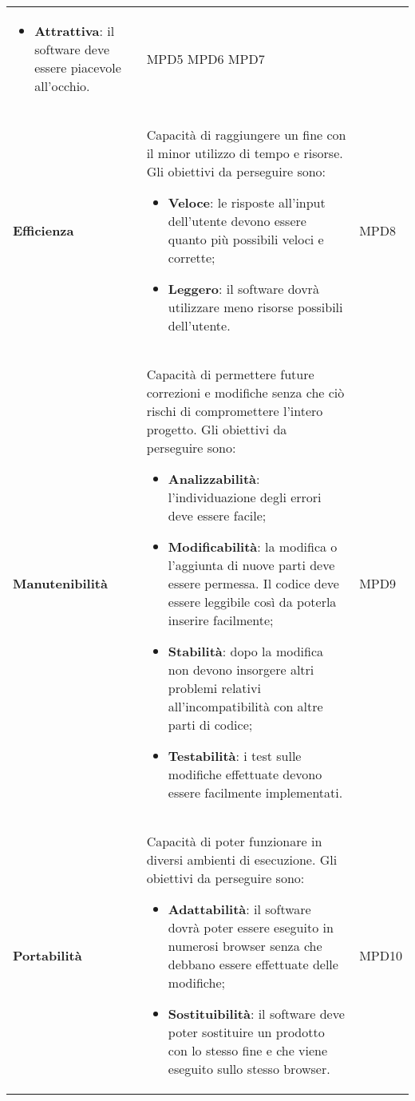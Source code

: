 \begin{longtable}{C{3cm} C{9.5cm} C{2.5cm}}
\begin{itemize}
		\item \textbf{Attrattiva}: il software deve essere piacevole all'occhio.
	\end{itemize} &
    MPD5 \newline MPD6 \newline MPD7 \\
	\textbf{Efficienza} & 
	Capacità di raggiungere un fine con il minor utilizzo di tempo e risorse. Gli obiettivi da perseguire sono: 
		\begin{itemize}
		\item \textbf{Veloce}: le risposte all'input dell'utente devono essere quanto più possibili veloci e corrette;
		\item \textbf{Leggero}: il software dovrà utilizzare meno risorse possibili dell'utente.
	\end{itemize} &
	MPD8 \\
	\textbf{Manutenibilità} & 
	Capacità di permettere future correzioni e modifiche senza che ciò rischi di compromettere l'intero progetto. Gli obiettivi da perseguire sono: 
		\begin{itemize}
		\item \textbf{Analizzabilità}: l'individuazione degli errori deve essere facile;
		\item \textbf{Modificabilità}: la modifica o l'aggiunta di nuove parti deve essere permessa. Il codice deve essere leggibile così da poterla inserire facilmente;
		\item \textbf{Stabilità}: dopo la modifica non devono insorgere altri problemi relativi all'incompatibilità con altre parti di codice;
		\item \textbf{Testabilità}: i test sulle modifiche effettuate devono essere facilmente implementati.
	\end{itemize} &
 	MPD9 \\
	\textbf{Portabilità} & 
	Capacità di poter funzionare in diversi ambienti di esecuzione. Gli obiettivi da perseguire sono: 
		\begin{itemize}
		\item \textbf{Adattabilità}: il software dovrà poter essere eseguito in numerosi browser senza che debbano essere effettuate delle modifiche;
		\item \textbf{Sostituibilità}: il software deve poter sostituire un prodotto con lo stesso fine e che viene eseguito sullo stesso browser. 
	\end{itemize} &
	MPD10 \\
	
\end{longtable}	

